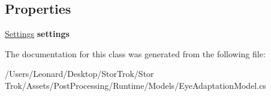 \subsection*{Properties}
\begin{DoxyCompactItemize}
\item 
\mbox{\label{class_unity_engine_1_1_post_processing_1_1_eye_adaptation_model_ad90e61c36b7832a43da25e407c045dc4}} 
\hyperlink{struct_unity_engine_1_1_post_processing_1_1_eye_adaptation_model_1_1_settings}{Settings} {\bfseries settings}
\end{DoxyCompactItemize}


The documentation for this class was generated from the following file\+:\begin{DoxyCompactItemize}
\item 
/\+Users/\+Leonard/\+Desktop/\+Stor\+Trok/\+Stor Trok/\+Assets/\+Post\+Processing/\+Runtime/\+Models/Eye\+Adaptation\+Model.\+cs\end{DoxyCompactItemize}
